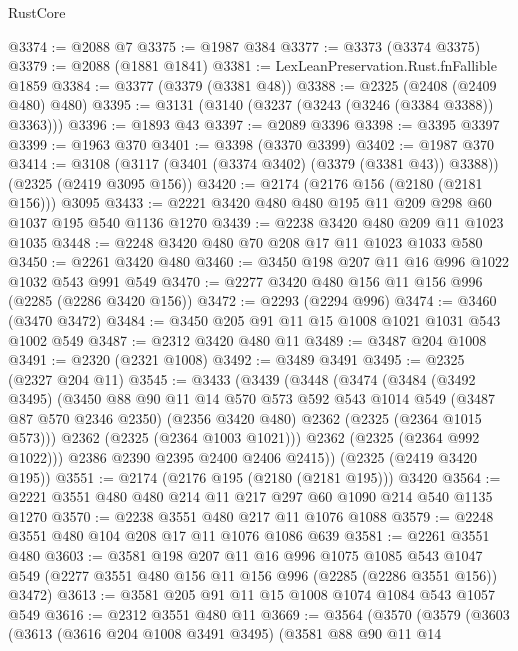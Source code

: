 \begin{lexlean}{RustCore}
\begin{coremodule}
@3374 := @2088 @7
@3375 := @1987 @384
@3377 := @3373 (@3374 @3375)
@3379 := @2088 (@1881 @1841)
@3381 := LexLeanPreservation.Rust.fnFallible @1859
@3384 := @3377 (@3379 (@3381 @48))
@3388 := @2325 (@2408 (@2409 @480) @480)
@3395 := @3131 (@3140 (@3237 (@3243 (@3246 (@3384 @3388)) @3363)))
@3396 := @1893 @43
@3397 := @2089 @3396
@3398 := @3395 @3397
@3399 := @1963 @370
@3401 := @3398 (@3370 @3399)
@3402 := @1987 @370
@3414 := @3108 (@3117 (@3401 (@3374 @3402) (@3379 (@3381 @43)) @3388)) (@2325 (@2419 @3095 @156))
@3420 := @2174 (@2176 @156 (@2180 (@2181 @156))) @3095
@3433 := @2221 @3420 @480 @480 @195 @11 @209 @298 @60 @1037 @195 @540 @1136 @1270
@3439 := @2238 @3420 @480 @209 @11 @1023 @1035
@3448 := @2248 @3420 @480 @70 @208 @17 @11 @1023 @1033 @580
@3450 := @2261 @3420 @480
@3460 := @3450 @198 @207 @11 @16 @996 @1022 @1032 @543 @991 @549
@3470 := @2277 @3420 @480 @156 @11 @156 @996 (@2285 (@2286 @3420 @156))
@3472 := @2293 (@2294 @996)
@3474 := @3460 (@3470 @3472)
@3484 := @3450 @205 @91 @11 @15 @1008 @1021 @1031 @543 @1002 @549
@3487 := @2312 @3420 @480 @11
@3489 := @3487 @204 @1008
@3491 := @2320 (@2321 @1008)
@3492 := @3489 @3491
@3495 := @2325 (@2327 @204 @11)
@3545 := @3433
    (@3439
      (@3448
        (@3474
          (@3484
            (@3492 @3495)
            (@3450
              @88
              @90
              @11
              @14
              @570
              @573
              @592
              @543
              @1014
              @549
              (@3487 @87 @570 @2346 @2350)
              (@2356 @3420 @480)
              @2362
              (@2325 (@2364 @1015 @573)))
            @2362
            (@2325 (@2364 @1003 @1021)))
          @2362
          (@2325 (@2364 @992 @1022)))
        @2386
        @2390
        @2395
        @2400
        @2406
        @2415))
    (@2325 (@2419 @3420 @195))
@3551 := @2174 (@2176 @195 (@2180 (@2181 @195))) @3420
@3564 := @2221 @3551 @480 @480 @214 @11 @217 @297 @60 @1090 @214 @540 @1135 @1270
@3570 := @2238 @3551 @480 @217 @11 @1076 @1088
@3579 := @2248 @3551 @480 @104 @208 @17 @11 @1076 @1086 @639
@3581 := @2261 @3551 @480
@3603 := @3581
    @198
    @207
    @11
    @16
    @996
    @1075
    @1085
    @543
    @1047
    @549
    (@2277 @3551 @480 @156 @11 @156 @996 (@2285 (@2286 @3551 @156)) @3472)
@3613 := @3581 @205 @91 @11 @15 @1008 @1074 @1084 @543 @1057 @549
@3616 := @2312 @3551 @480 @11
@3669 := @3564
    (@3570
      (@3579
        (@3603
          (@3613
            (@3616 @204 @1008 @3491 @3495)
            (@3581
              @88
              @90
              @11
              @14

\end{coremodule}
\end{lexlean}
